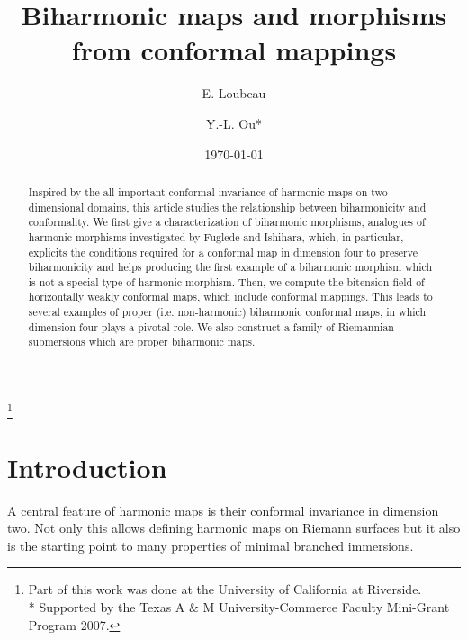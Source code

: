 \documentclass[12pt]{amsart}
\theoremstyle{plain}
\theoremstyle{definition}
\begin{document}
\begin{abstract}
Inspired by the all-important conformal invariance of harmonic maps on
two-dimensional domains, this article studies the relationship between biharmonicity
and conformality.  We first give a characterization of biharmonic morphisms,
analogues of harmonic morphisms investigated by Fuglede and Ishihara, which, in
particular, explicits the conditions required for a conformal map in dimension four
to preserve biharmonicity and helps producing the first example of a biharmonic
morphism which is not a special type of harmonic morphism. Then, we compute
 the bitension field of horizontally weakly conformal maps, which
include conformal mappings. This leads to several examples of proper (i.e. non-harmonic) biharmonic
 conformal maps, in which dimension four plays a pivotal role.
We also construct a family of Riemannian submersions which are proper biharmonic maps.
\end{abstract}

\title[Biharmonic maps and morphisms]{Biharmonic maps and morphisms from conformal mappings}
\author{E. Loubeau}
\address{D{\'e}partement de Math{\'e}matiques\\
Universit{\'e} de Bretagne Occidentale\\
6, avenue Victor Le Gorgeu\\
BP 809\\
29285 Brest Cedex\\
France.} 
\author{Y.-L. Ou*}
\address{Department of Mathematics \\
Texas A\&M University-Commerce \\
Commerce, TX 75429\\
USA.} 
\thanks{Part of this work was done at the University of California at Riverside. \\
* Supported by the Texas A \& M University-Commerce Faculty Mini-Grant Program 2007.}
\date{\today}
  \maketitle

\section{Introduction}

A central feature of harmonic maps is their conformal invariance in dimension two.
Not only this allows defining harmonic maps on Riemann
surfaces but it also is the starting point to many properties of minimal branched immersions.
\end{document}
